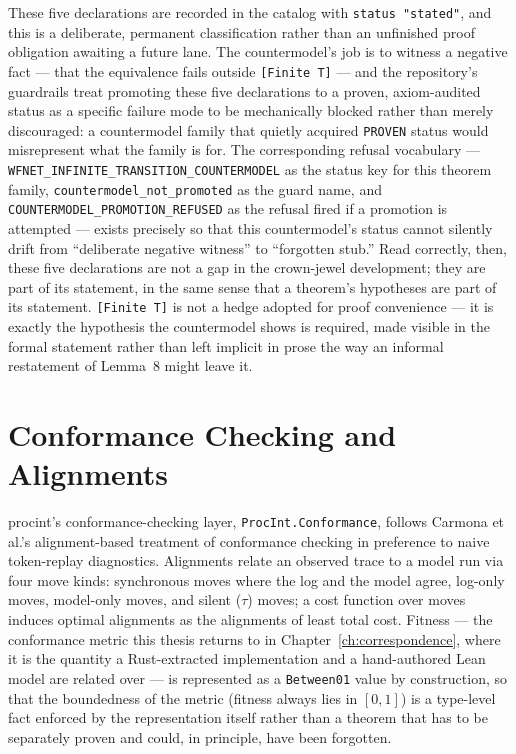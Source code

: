 These five declarations are recorded in the catalog with \texttt{status
"stated"}, and this is a deliberate, permanent classification rather than
an unfinished proof obligation awaiting a future lane. The countermodel's
job is to witness a negative fact --- that the equivalence fails outside
\texttt{[Finite T]} --- and the repository's guardrails treat promoting
these five declarations to a proven, axiom-audited status as a specific
failure mode to be mechanically blocked rather than merely discouraged:
a countermodel family that quietly acquired \texttt{PROVEN} status would
misrepresent what the family is for. The corresponding refusal vocabulary
--- \texttt{WFNET\_INFINITE\_TRANSITION\_COUNTERMODEL} as the status key
for this theorem family, \texttt{countermodel\_not\_promoted} as the guard
name, and \texttt{COUNTERMODEL\_PROMOTION\_REFUSED} as the refusal fired
if a promotion is attempted --- exists precisely so that this
countermodel's status cannot silently drift from ``deliberate negative
witness'' to ``forgotten stub.'' Read correctly, then, these five
declarations are not a gap in the crown-jewel development; they are part
of its statement, in the same sense that a theorem's hypotheses are part
of its statement. \texttt{[Finite T]} is not a hedge adopted for proof
convenience --- it is exactly the hypothesis the countermodel shows is
required, made visible in the formal statement rather than left implicit
in prose the way an informal restatement of Lemma~8 might leave it.

\section{Conformance Checking and Alignments}
\label{sec:procint-conformance}

\textsf{procint}'s conformance-checking layer, \texttt{ProcInt.Conformance},
follows Carmona et al.'s alignment-based treatment of conformance checking
\cite{carmona2018} in preference to naive token-replay diagnostics.
Alignments relate an observed trace to a model run via four move kinds:
synchronous moves where the log and the model agree, log-only moves,
model-only moves, and silent (\(\tau\)) moves; a cost function over moves
induces optimal alignments as the alignments of least total cost. Fitness
--- the conformance metric this thesis returns to in
Chapter~\ref{ch:correspondence}, where it is the quantity a Rust-extracted
implementation and a hand-authored Lean model are related over --- is
represented as a \texttt{Between01} value by construction, so that the
boundedness of the metric (fitness always lies in \([0,1]\)) is a
type-level fact enforced by the representation itself rather than a
theorem that has to be separately proven and could, in principle, have
been forgotten.


